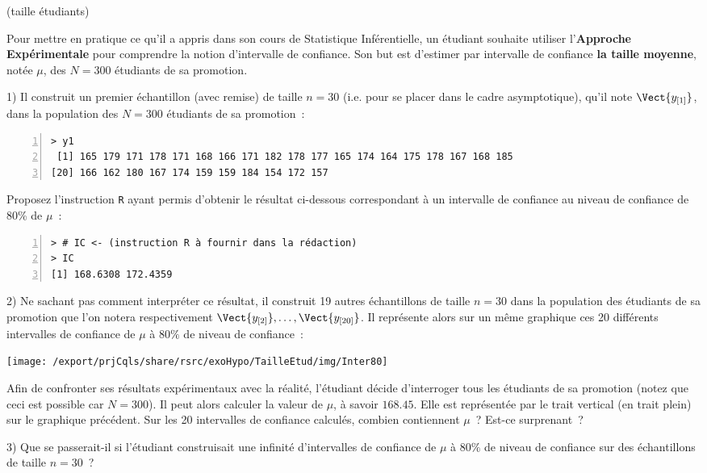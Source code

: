 \documentclass[10pt]{report}
\begin{document}
\begin{exercice} (taille étudiants)

Pour mettre en pratique ce qu'il a appris dans son cours de Statistique Inf{\'e}rentielle, un {\'e}tudiant souhaite utiliser l'\textbf{Approche Exp{\'e}rimentale} pour comprendre la notion d'intervalle de confiance. Son but est d'estimer par intervalle de confiance  \textbf{la taille moyenne}, not{\'e}e $\mu$, des $N=300$ {\'e}tudiants de sa promotion. 

1) Il construit un premier {\'e}chantillon (avec remise) de taille $n=30$ (i.e. pour se placer dans le cadre asymptotique), qu'il note $\Vect{y_{[1]}}$, dans la population des $N=300$ {\'e}tudiants de sa promotion~:

\begin{Verbatim}[frame=leftline,fontfamily=tt,fontshape=n,numbers=left]
> y1
 [1] 165 179 171 178 171 168 166 171 182 178 177 165 174 164 175 178 167 168 185
[20] 166 162 180 167 174 159 159 184 154 172 157
\end{Verbatim}


Proposez l'instruction \texttt{R} ayant permis d'obtenir le résultat ci-dessous correspondant à un intervalle de confiance au niveau de confiance de 80\% de $\mu$~:

\IndicR
\begin{Verbatim}[frame=leftline,fontfamily=tt,fontshape=n,numbers=left]
> # IC <- (instruction R à fournir dans la rédaction)
> IC
[1] 168.6308 172.4359
\end{Verbatim}





2) Ne sachant pas comment interpr{\'e}ter ce r{\'e}sultat, il construit 19 autres {\'e}chantillons de taille $n=30$ dans la population des {\'e}tudiants de sa promotion que l'on notera respectivement $\Vect{y_{[2]}},\ldots,\Vect{y_{[20]}}$. Il repr{\'e}sente alors sur un m{\^e}me graphique ces 20 diff{\'e}rents intervalles de confiance de $\mu$ {\`a} $80\%$ de niveau de confiance~:
\begin{center}
\texttt{[image: /export/prjCqls/share/rsrc/exoHypo/TailleEtud/img/Inter80]} 
\end{center}

Afin de confronter ses r{\'e}sultats exp{\'e}rimentaux avec la r{\'e}alit{\'e}, l'{\'e}tudiant d{\'e}cide d'interroger tous les {\'e}tudiants de sa promotion (notez que ceci est possible car $N=300$). Il peut alors calculer la valeur de $\mu$, {\`a} savoir $168.45$. Elle est repr{\'e}sent{\'e}e par le trait vertical (en trait plein) sur le graphique pr{\'e}c{\'e}dent. Sur les 20 intervalles de confiance calcul{\'e}s, combien contiennent $\mu$~? Est-ce surprenant~? 




3) Que se passerait-il si l'{\'e}tudiant construisait une infinit{\'e} d'intervalles de confiance de $\mu$ {\`a} $80\%$ de niveau de confiance sur des {\'e}chantillons de taille $n=30$~? \\



\end{exercice}
\end{document}
